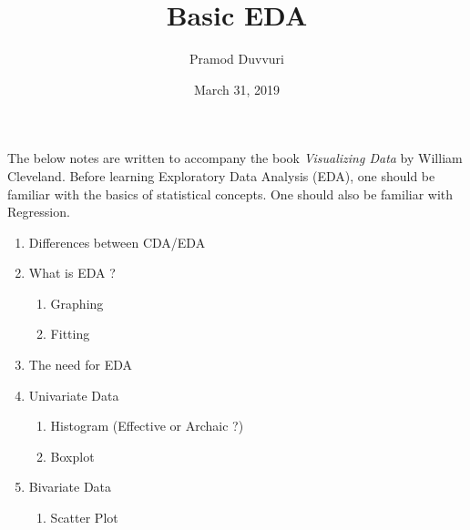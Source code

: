 \documentclass[11pt]{article}
\title{Basic EDA}
\author{Pramod Duvvuri}
\date{March 31, 2019}
\begin{document}
	\maketitle
	The below notes are written to accompany the book \textit{Visualizing Data} by William Cleveland. Before learning Exploratory Data Analysis (EDA), one should be familiar with the basics of statistical concepts. One should also be familiar with Regression.
	\begin{enumerate}
		\item Differences between CDA/EDA
		\item What is EDA ?
		\begin{enumerate}
			\item Graphing
			\item Fitting
		\end{enumerate}
	    \item The need for EDA
		\item Univariate Data
		\begin{enumerate}
			\item Histogram (Effective or Archaic ?)
			\item Boxplot
		\end{enumerate}
	\item Bivariate Data
	\begin{enumerate}
		\item Scatter Plot
	\end{enumerate}
	\end{enumerate}
\end{document}
